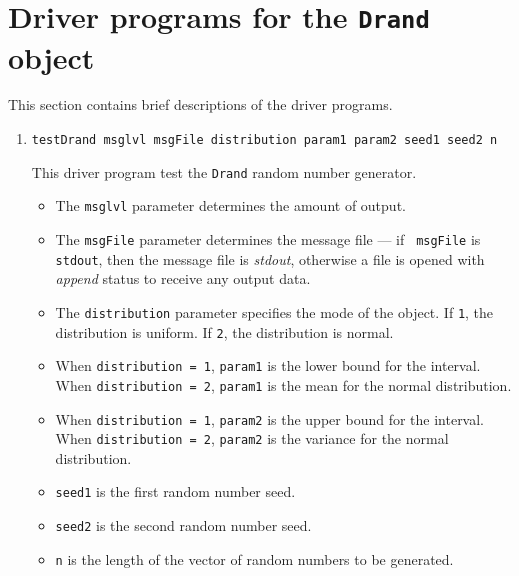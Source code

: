\par
\section{Driver programs for the {\tt Drand} object}
\label{section:Drand:drivers}
\par
This section contains brief descriptions of the driver programs.
\par
\begin{enumerate}
\item
\begin{verbatim}
testDrand msglvl msgFile distribution param1 param2 seed1 seed2 n
\end{verbatim}
This driver program test the {\tt Drand} random number generator.
\par
\begin{itemize}
\item
The {\tt msglvl} parameter determines the amount of output.
\item
The {\tt msgFile} parameter determines the message file --- if {\tt
msgFile} is {\tt stdout}, then the message file is {\it stdout},
otherwise a file is opened with {\it append} status to receive any
output data.
\item
The {\tt distribution} parameter specifies the mode of the object.
If {\tt 1}, the distribution is uniform.
If {\tt 2}, the distribution is normal.
\item
When {\tt distribution = 1}, {\tt param1} is the lower bound for
the interval.
When {\tt distribution = 2}, {\tt param1} is the mean for the
normal distribution.
\item
When {\tt distribution = 1}, {\tt param2} is the upper bound for
the interval.
When {\tt distribution = 2}, {\tt param2} is the variance for the
normal distribution.
\item
{\tt seed1} is the first random number seed.
\item
{\tt seed2} is the second random number seed.
\item
{\tt n} is the length of the vector of random numbers to be
generated.
\end{itemize}
\end{enumerate}
